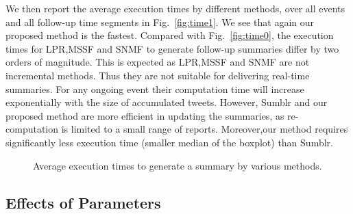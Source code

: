 \documentclass[runningheads]{llncs}
\begin{document}
We then report the average execution times by different methods, over all events and all follow-up time segments in Fig.~\ref{fig:time1}. We see that again our proposed method is the fastest. Compared with Fig.~\ref{fig:time0}, the execution times for LPR,MSSF and SNMF to generate follow-up summaries differ by two orders of magnitude. This is expected as LPR,MSSF and SNMF are not incremental methods. Thus they are not suitable for delivering real-time summaries.  For any ongoing event their computation time will increase exponentially with the size of accumulated tweets. However, Sumblr and our proposed method are more efficient in updating the summaries, as re-computation is limited to a small range of reports. Moreover,our method requires  significantly less execution time (smaller median of the boxplot) than Sumblr.

\begin{figure}
\centering
{}
\hspace{-4ex}
\setlength{\abovecaptionskip}{-0.1cm}
\caption{Average execution times to generate a summary by various methods. }
\end{figure}

\subsection{Effects of Parameters}
\end{document}

